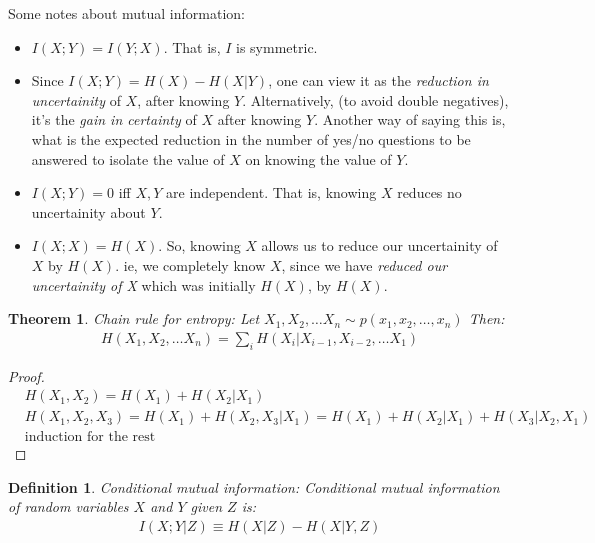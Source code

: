 \documentclass[11pt]{book}
\renewcommand{\H}{\ensuremath{H}}
\newcommand{\I}{\ensuremath{I}}
\newtheorem{theorem}{Theorem}
\newtheorem{definition}{Definition}
\newtheorem{proof}{Proof}
\begin{document}
Some notes about mutual information:
\begin{itemize}
    \item $I(X; Y) = I(Y;X)$. That is, $I$ is symmetric.

    \item Since $I(X;Y) = H(X) - H(X|Y)$, one can view it as the 
         \textit{reduction in uncertainity} of $X$, after knowing $Y$. 
         Alternatively, (to avoid double negatives), it's the \textit{gain in
         certainty} of $X$ after knowing $Y$.  Another way of saying this is,
         what is the expected reduction in the number of yes/no questions to be
         answered to isolate the value of $X$ on knowing the value of $Y$.

    \item $I(X;Y) = 0$ iff $X, Y$ are independent. That is, knowing $X$ reduces
        no uncertainity about $Y$.

    \item $I(X;X) = H(X)$. So, knowing $X$ allows us to reduce our uncertainity
        of $X$ by $H(X)$. ie, we completely know $X$, since we have
        \textit{reduced our uncertainity of X} which was initially $H(X)$, by $H(X)$.

\end{itemize}

\begin{theorem}
    Chain rule for entropy: Let $X_1, X_2, \dots X_n \sim p(x_1, x_2, \dots, x_n)$
    Then:
    \begin{align*}
        \H(X_1, X_2, \dots X_n) = \sum_i \H(X_i | X_{i-1}, X_{i-2}, \dots X_1)
    \end{align*}
\end{theorem}
\begin{proof}
    \begin{align*}
    &\H(X_1, X_2) = \H(X_1) + \H(X_2 | X_1) \\
    &\H(X_1, X_2, X_3) = \H(X_1) + \H(X_2, X_3 | X_1) = \H(X_1) + H(X_2 | X_1) + H(X_3 | X_2, X_1) \\
    &\text{induction for the rest}
    \end{align*}
\end{proof}

\begin{definition}
    Conditional mutual information: Conditional mutual information of random
    variables $X$ and $Y$ given $Z$ is:
    \begin{align*}
        \I(X; Y | Z) \equiv \H(X|Z) - \H(X|Y, Z)
    \end{align*}
\end{definition}
\end{document}
